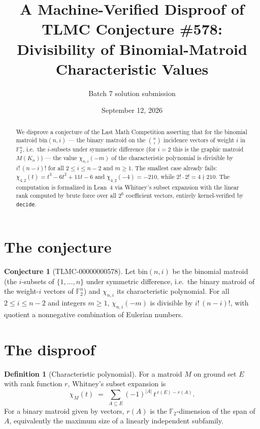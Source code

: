 \documentclass[11pt]{article}
\title{A Machine-Verified Disproof of TLMC Conjecture \#578:\\ Divisibility of Binomial-Matroid Characteristic Values}
\author{Batch 7 solution submission}
\date{September 12, 2026}
\theoremstyle{definition}
\newtheorem{definition}[theorem]{Definition}
\newtheorem{conjecture}[theorem]{Conjecture}
\theoremstyle{remark}
\begin{document}
\maketitle

\begin{abstract}
We disprove a conjecture of the Last Math Competition asserting that for the binomial matroid $\mathrm{bin}(n,i)$ — the binary matroid on the $\binom{n}{i}$ incidence vectors of weight $i$ in $\mathbb{F}_2^n$, i.e.\ the $i$-subsets under symmetric difference (for $i = 2$ this is the graphic matroid $M(K_n)$) — the value $\chi_{n,i}(-m)$ of the characteristic polynomial is divisible by $i!\,(n-i)!$ for all $2 \le i \le n-2$ and $m \ge 1$. The smallest case already fails: $\chi_{4,2}(t) = t^3 - 6t^2 + 11t - 6$ and $\chi_{4,2}(-4) = -210$, while $2!\cdot 2! = 4 \nmid 210$. The computation is formalized in Lean~4 via Whitney's subset expansion with the linear rank computed by brute force over all $2^6$ coefficient vectors, entirely kernel-verified by \texttt{decide}.
\end{abstract}

\section{The conjecture}

\begin{conjecture}[TLMC-00000000578]\label{conj:578}
Let $\mathrm{bin}(n,i)$ be the binomial matroid (the $i$-subsets of $\{1,\dots,n\}$ under symmetric difference, i.e.\ the binary matroid of the weight-$i$ vectors of $\mathbb{F}_2^n$) and $\chi_{n,i}$ its characteristic polynomial. For all $2 \le i \le n-2$ and integers $m \ge 1$, $\chi_{n,i}(-m)$ is divisible by $i!\,(n-i)!$, with quotient a nonnegative combination of Eulerian numbers.
\end{conjecture}

\section{The disproof}

\begin{definition}[Characteristic polynomial]
For a matroid $M$ on ground set $E$ with rank function $r$, Whitney's subset expansion is
\[
\chi_M(t) \;=\; \sum_{A \subseteq E} (-1)^{|A|}\, t^{\,r(E) - r(A)} .
\]
For a binary matroid given by vectors, $r(A)$ is the $\mathbb{F}_2$-dimension of the span of $A$, equivalently the maximum size of a linearly independent subfamily.
\end{definition}
\end{document}
